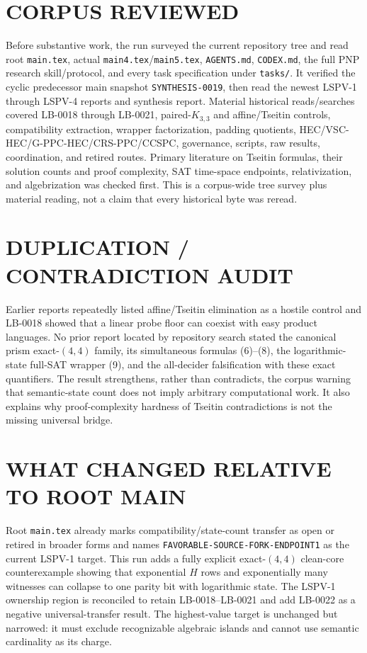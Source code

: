 \documentclass[11pt]{article}
\begin{document}
\section{CORPUS REVIEWED}

Before substantive work, the run surveyed the current repository tree and read root \texttt{main.tex}, actual \texttt{main4.tex}/\texttt{main5.tex}, \texttt{AGENTS.md}, \texttt{CODEX.md}, the full PNP research skill/protocol, and every task specification under \texttt{tasks/}.  It verified the cyclic predecessor main snapshot \texttt{SYNTHESIS-0019}, then read the newest LSPV-1 through LSPV-4 reports and synthesis report.  Material historical reads/searches covered LB-0018 through LB-0021, paired-$K_{3,3}$ and affine/Tseitin controls, compatibility extraction, wrapper factorization, padding quotients, HEC/VSC-HEC/G-PPC-HEC/CRS-PPC/CCSPC, governance, scripts, raw results, coordination, and retired routes.  Primary literature on Tseitin formulas, their solution counts and proof complexity, SAT time-space endpoints, relativization, and algebrization was checked first.  This is a corpus-wide tree survey plus material reading, not a claim that every historical byte was reread.

\section{DUPLICATION / CONTRADICTION AUDIT}

Earlier reports repeatedly listed affine/Tseitin elimination as a hostile control and LB-0018 showed that a linear probe floor can coexist with easy product languages.  No prior report located by repository search stated the canonical prism exact-$(4,4)$ family, its simultaneous formulas (6)--(8), the logarithmic-state full-SAT wrapper (9), and the all-decider falsification with these exact quantifiers.  The result strengthens, rather than contradicts, the corpus warning that semantic-state count does not imply arbitrary computational work.  It also explains why proof-complexity hardness of Tseitin contradictions is not the missing universal bridge.

\section{WHAT CHANGED RELATIVE TO ROOT MAIN}

Root \texttt{main.tex} already marks compatibility/state-count transfer as open or retired in broader forms and names \texttt{FAVORABLE-SOURCE-FORK-ENDPOINT1} as the current LSPV-1 target.  This run adds a fully explicit exact-$(4,4)$ clean-core counterexample showing that exponential $H$ rows and exponentially many witnesses can collapse to one parity bit with logarithmic state.  The LSPV-1 ownership region is reconciled to retain LB-0018--LB-0021 and add LB-0022 as a negative universal-transfer result.  The highest-value target is unchanged but narrowed: it must exclude recognizable algebraic islands and cannot use semantic cardinality as its charge.
\end{document}

